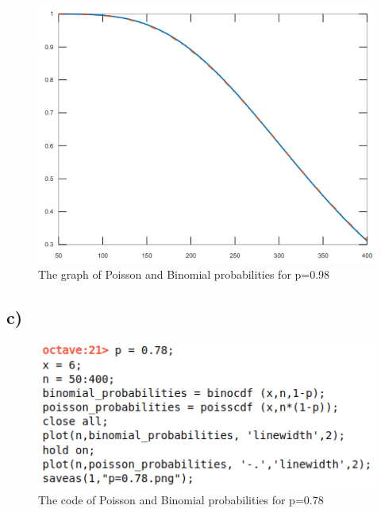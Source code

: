 \documentclass[12pt]{article}
\begin{document}
\begin{figure}[H]
    \centering
    \includegraphics[scale=0.5]{3b_graph}
    \caption{The graph of Poisson and Binomial probabilities for p=0.98}
\end{figure}

\subsection*{c)} 

\begin{figure}[H]
    \centering
    \includegraphics[scale=0.6]{3c_cod}
    \caption{The code  of Poisson and Binomial probabilities for p=0.78}
\end{figure}
\end{document}
